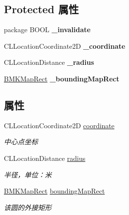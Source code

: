 \subsection*{Protected 属性}
\begin{DoxyCompactItemize}
\item 
\hypertarget{interface_b_m_k_circle_a2dffabfbaa1ac6642adc5a475d6ee453}{}package B\+O\+O\+L {\bfseries \+\_\+invalidate}\label{interface_b_m_k_circle_a2dffabfbaa1ac6642adc5a475d6ee453}

\item 
\hypertarget{interface_b_m_k_circle_abdd404f22d461b81d8d4d203778cee58}{}C\+L\+Location\+Coordinate2\+D {\bfseries \+\_\+coordinate}\label{interface_b_m_k_circle_abdd404f22d461b81d8d4d203778cee58}

\item 
\hypertarget{interface_b_m_k_circle_a84860dbbaa96509cfa4c7590908aabe8}{}C\+L\+Location\+Distance {\bfseries \+\_\+radius}\label{interface_b_m_k_circle_a84860dbbaa96509cfa4c7590908aabe8}

\item 
\hypertarget{interface_b_m_k_circle_abfa42e25c856dd426fb74b9531e1061b}{}\hyperlink{struct_b_m_k_map_rect}{B\+M\+K\+Map\+Rect} {\bfseries \+\_\+bounding\+Map\+Rect}\label{interface_b_m_k_circle_abfa42e25c856dd426fb74b9531e1061b}

\end{DoxyCompactItemize}
\subsection*{属性}
\begin{DoxyCompactItemize}
\item 
\hypertarget{interface_b_m_k_circle_a1c516c10dec1971c686e07f814f333f9}{}C\+L\+Location\+Coordinate2\+D \hyperlink{interface_b_m_k_circle_a1c516c10dec1971c686e07f814f333f9}{coordinate}\label{interface_b_m_k_circle_a1c516c10dec1971c686e07f814f333f9}

\begin{DoxyCompactList}\small\item\em 中心点坐标 \end{DoxyCompactList}\item 
\hypertarget{interface_b_m_k_circle_a42507e4c17b4a1c1309fcbe06e370bf5}{}C\+L\+Location\+Distance \hyperlink{interface_b_m_k_circle_a42507e4c17b4a1c1309fcbe06e370bf5}{radius}\label{interface_b_m_k_circle_a42507e4c17b4a1c1309fcbe06e370bf5}

\begin{DoxyCompactList}\small\item\em 半径，单位：米 \end{DoxyCompactList}\item 
\hypertarget{interface_b_m_k_circle_a462a1696e47b1523dd481b22d43bcf46}{}\hyperlink{struct_b_m_k_map_rect}{B\+M\+K\+Map\+Rect} \hyperlink{interface_b_m_k_circle_a462a1696e47b1523dd481b22d43bcf46}{bounding\+Map\+Rect}\label{interface_b_m_k_circle_a462a1696e47b1523dd481b22d43bcf46}

\begin{DoxyCompactList}\small\item\em 该圆的外接矩形 \end{DoxyCompactList}\end{DoxyCompactItemize}
